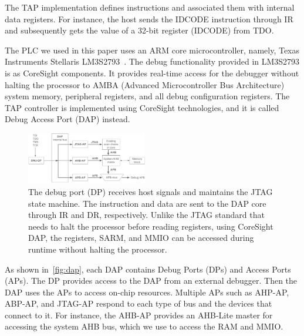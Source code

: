The TAP implementation defines instructions and associated them with internal data registers. For instance, the host sends the IDCODE instruction through IR and subsequently gets the value of a 32-bit register (IDCODE) from TDO.

The PLC we used in this paper uses an ARM core microcontroller, namely, Texas Instruments Stellaris LM3S2793~\cite{lm3s2793}. The debug functionality provided in LM3S2793 is as CoreSight components. It provides real-time access for the debugger without halting the processor to AMBA (Advanced Microcontroller Bus Architecture)~\cite{flynn1997amba} system memory, peripheral registers, and all debug configuration registers. The TAP controller is implemented using CoreSight technologies, and it is called Debug Access Port (DAP) instead.

\begin{figure}[ht]
	\includegraphics[width=0.47\textwidth]{figures/dap}
	\centering
	\caption{The debug port (DP) receives host signals and maintains the JTAG state machine. The instruction and data are sent to the DAP core through IR and DR, respectively. Unlike the JTAG standard that needs to halt the processor before reading registers, using CoreSight DAP, the registers, SARM, and MMIO can be accessed during runtime without halting the processor.}
	\label{fig:dap}
\end{figure}


As shown in~\autoref{fig:dap}, each DAP contains Debug Ports (DPs) and Access Ports (APs). The DP provides access to the DAP from an external debugger. Then the DAP uses the APs to access on-chip resources. Multiple APs such as AHP-AP, ABP-AP, and JTAG-AP respond to each type of bus and the devices that connect to it. For instance, the AHB-AP provides an AHB-Lite master for accessing the system AHB bus, which we use to access the RAM and MMIO.



